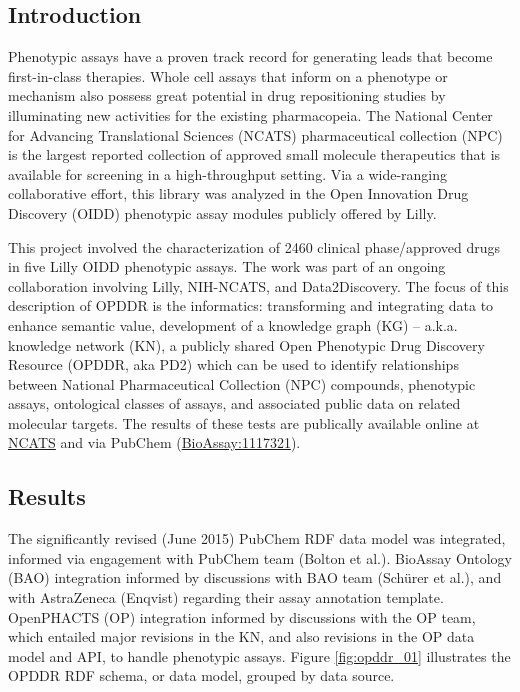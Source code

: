 \subsection{Introduction}

Phenotypic assays have a proven track record for generating leads that become first-in-class therapies. Whole cell assays that inform on a phenotype or mechanism also possess great potential in drug repositioning studies by illuminating new activities for the existing pharmacopeia. The National Center for Advancing Translational Sciences (NCATS) pharmaceutical collection (NPC) is the largest reported collection of approved small molecule therapeutics that is available for screening in a high-throughput setting. Via a wide-ranging collaborative effort, this library was analyzed in the Open Innovation Drug Discovery (OIDD) phenotypic assay modules publicly offered by Lilly. 

This project involved the characterization of 2460 clinical phase/approved drugs in five Lilly OIDD phenotypic assays. The work was part of an ongoing collaboration involving Lilly, NIH-NCATS, and Data2Discovery.  The focus of this description of OPDDR is the informatics: transforming and integrating data to enhance semantic value, development of a knowledge graph (KG) -- a.k.a. knowledge network (KN), a publicly shared Open Phenotypic Drug Discovery Resource (OPDDR, aka PD2) which can be used to identify relationships between National Pharmaceutical Collection (NPC) compounds, phenotypic assays, ontological classes of assays, and associated public data on related molecular targets. The results of these tests are publically available online at \href{https://www.ncats.nih.gov/expertise/preclinical/pd2}{NCATS} and via PubChem (\href{https://pubchem.ncbi.nlm.nih.gov/bioassay/1117321}{BioAssay:1117321}).

\subsection{Results}

The significantly revised (June 2015) PubChem RDF data model was integrated, informed via engagement with PubChem team (Bolton et al.). BioAssay Ontology (BAO) integration informed by discussions with BAO team (Sch\"urer et al.), and with AstraZeneca (Enqvist) regarding their assay annotation template. OpenPHACTS (OP) integration informed by discussions with the OP team, which entailed major revisions in the KN, and also revisions in the OP data model and API, to handle phenotypic assays. Figure \ref{fig:opddr_01} illustrates the OPDDR RDF schema, or data model, grouped by data source.

